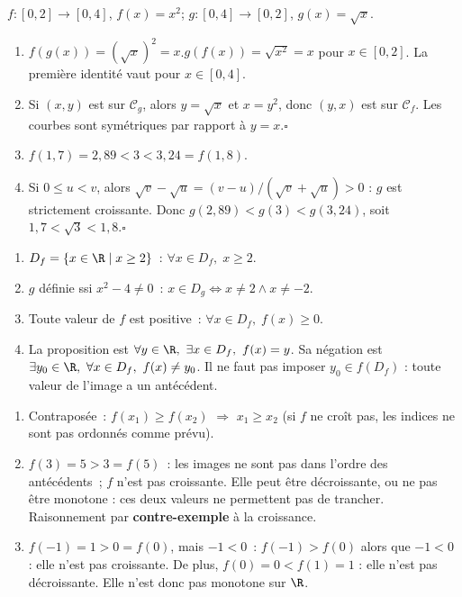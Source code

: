 $f:[0,2]\to[0,4]$, $f(x)=x^2$; $g:[0,4]\to[0,2]$, $g(x)=\sqrt{x}$.
\begin{enumerate}
  \item $f(g(x))=(\sqrt{x})^2=x$.\checkmark\quad $g(f(x))=\sqrt{x^2}=x$ pour $x\in[0,2]$.
        La premi\`ere identit\'e vaut pour $x\in[0,4]$.\checkmark
  \item Si $(x,y)$ est sur $\mathcal{C}_g$, alors $y=\sqrt{x}$ et $x=y^2$, donc $(y,x)$ est sur $\mathcal{C}_f$.
        Les courbes sont sym\'etriques par rapport \`a $y=x$.\hfill$\square$
  \item $f(1{,}7)=2{,}89<3<3{,}24=f(1{,}8)$.
  \item Si $0\leq u<v$, alors
        $\sqrt v-\sqrt u=(v-u)/(\sqrt v+\sqrt u)>0$ : $g$ est strictement croissante.
        Donc $g(2{,}89)<g(3)<g(3{,}24)$, soit $1{,}7<\sqrt3<1{,}8$.\hfill$\square$
\end{enumerate}


\begin{enumerate}
  \item $D_f=\{x\in\R\mid x\geq2\}$~: $\forall x\in D_f,\;x\geq2$.
  \item $g$ d\'efinie ssi $x^2-4\ne0$~:
        $x\in D_g\Leftrightarrow x\ne2\wedge x\ne-2$.
  \item \og Toute valeur de $f$ est positive\fg~:
        $\forall x\in D_f,\;f(x)\geq0$.
  \item La proposition est $\forall y\in\R,\ \exists x\in D_f,\ f(x)=y$.
        Sa n\'egation est $\exists y_0\in\R,\ \forall x\in D_f,\ f(x)\ne y_0$.
        Il ne faut pas imposer $y_0\in f(D_f)$ : toute valeur de l'image a un ant\'ec\'edent.
\end{enumerate}


\begin{enumerate}
  \item Contrapos\'ee~: \og $f(x_1)\geq f(x_2)$\fg{} $\Rightarrow$
        \og $x_1\geq x_2$\fg{}
        (si $f$ ne croît pas, les indices ne sont pas ordonn\'es comme pr\'evu).
  \item $f(3)=5>3=f(5)$~: les images ne sont pas dans l'ordre des ant\'ec\'edents~;
        $f$ n'est pas croissante. Elle peut \^etre d\'ecroissante,
        ou ne pas \^etre monotone : ces deux valeurs ne permettent pas de trancher.
        Raisonnement par \textbf{contre-exemple} \`a la croissance.
  \item $f(-1)=1>0=f(0)$, mais $-1<0$~: $f(-1)>f(0)$ alors que $-1<0$ : elle n'est pas croissante.
        De plus, $f(0)=0<f(1)=1$ : elle n'est pas d\'ecroissante.
        Elle n'est donc pas monotone sur $\R$.
\end{enumerate}

